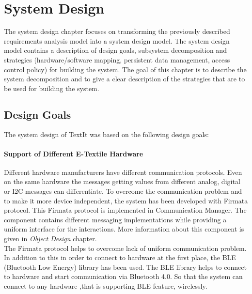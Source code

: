 
\chapter{System Design}
	The system design chapter focuses on transforming the previously described requirements analysis model into a system design model. The system design model contains a description of design goals, subsystem decomposition and strategies (hardware/software mapping, persistent data management, access control policy) for building the system. The goal of this chapter is to describe the system decomposition and to give a clear description of the strategies that are to be used for building the system.
	
\section{Design Goals}
The system design of TextIt was based on the following design goals:


	\subsubsection{Support of Different E-Textile Hardware} 
Different hardware manufacturers have different communication protocols. Even on the same hardware the messages getting values from different analog, digital or I2C messages can differentiate. To overcome the communication problem and to make it more device independent, the system has been developed with Firmata protocol. This Firmata protocol is implemented in Communication Manager. The component contains different messaging implementations while providing a uniform interface for the interactions. More information about this component is given in \textit{Object Design} chapter.\\

The Firmata protocol helps to overcome lack of uniform communication problem. In addition to this in order to connect to hardware at the first place, the BLE (Bluetooth Low Energy) library has been used. The BLE library helps to connect to hardware and start communication via Bluetooth 4.0. So that the system can connect to any hardware ,that is supporting BLE feature, wirelessly.

